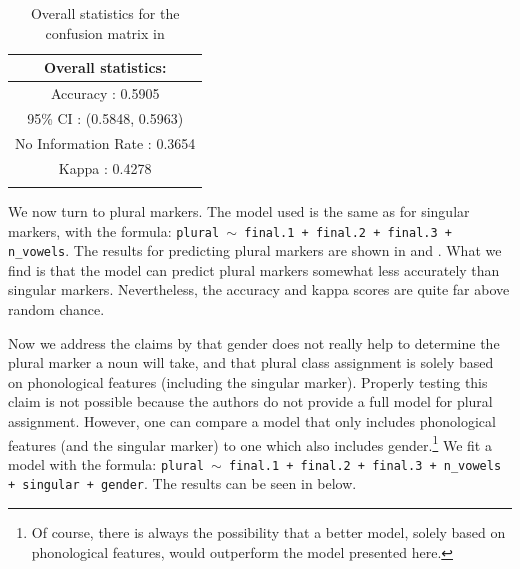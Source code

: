 \begin{table}[p]
  \centering
  \begin{tabular}{c}
    \lsptoprule
    Overall statistics: \\
    \midrule
    Accuracy : 0.5905\\
    95\% CI : (0.5848, 0.5963)\\
    No Information Rate : 0.3654\\
    Kappa : 0.4278\\
    \lspbottomrule
  \end{tabular}
  \caption{Overall statistics for the confusion matrix in }\label{tab:plural-romanian-stats}
\end{table}

We now turn to plural markers. The model used is the same as for singular markers, with the formula: \texttt{plural $\sim$ final.1 + final.2 + final.3 + n\_vowels}. The results for predicting plural markers are shown in  and . What we find is that the model can predict plural markers somewhat less accurately than singular markers. Nevertheless, the accuracy and kappa scores are quite far above random chance.



Now we address the claims by \textcite{Bateman.2010} that gender does not really help to determine the plural marker a noun will take, and that plural class assignment is solely based on phonological features (including the singular marker). Properly testing this claim is not possible because the authors do not provide a full model for plural assignment. However, one can compare a model that only includes phonological features (and the singular marker) to one which also includes gender.\footnote{Of course, there is always the possibility that a better model, solely based on phonological features, would outperform the model presented here.} We fit a model with the formula: \texttt{plural $\sim$ final.1 + final.2 + final.3 + n\_vowels + singular + gender}. The results can be seen in  below.

